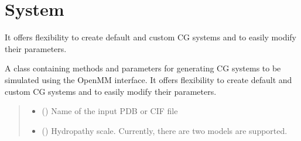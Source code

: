 \documentclass[letterpaper,10pt,english]{sphinxmanual}
\begin{document}
\sphinxstepscope


\chapter{System}
\label{\detokenize{modules/system:system}}\label{\detokenize{modules/system::doc}}\begin{description}
\sphinxAtStartPar
It offers flexibility to create default and custom CG systems and to easily modify their parameters.

\end{description}

\begin{fulllineitems}
\label{\detokenize{modules/system:hps.core.system}}
\pysigstartsignatures
{}
\pysigstopsignatures
\sphinxAtStartPar
A class containing methods and parameters for generating CG systems to be simulated using the OpenMM interface.
It offers flexibility to create default and custom CG systems and to easily modify their parameters.
\begin{quote}\begin{description}
\begin{itemize}
\item {} 
\sphinxAtStartPar
{} (\sphinxstyleliteralemphasis{\sphinxupquote{ {[}}}\sphinxstyleliteralemphasis{\sphinxupquote{{]}}}) \textendash{} Name of the input PDB or CIF file

\item {} 
\sphinxAtStartPar
{} (\sphinxstyleliteralemphasis{\sphinxupquote{,}}\sphinxstyleliteralemphasis{\sphinxupquote{ {[}}}\sphinxstyleliteralemphasis{\sphinxupquote{, }}\sphinxstyleliteralemphasis{\sphinxupquote{{]}}}) \textendash{} Hydropathy scale. Currently, there are two models are supported.


\end{itemize}
\end{description}
\end{quote}
\end{fulllineitems}
\end{document}

